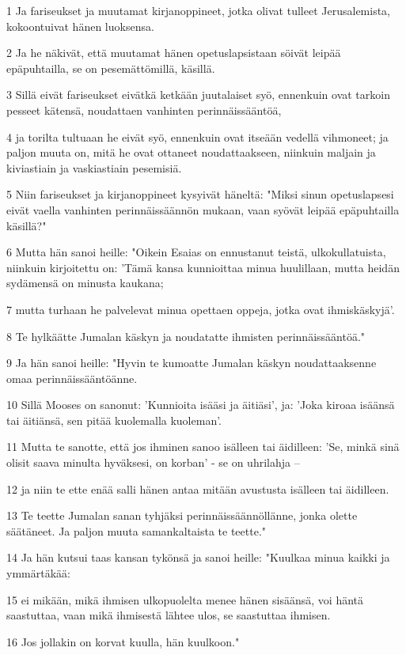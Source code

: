 \par 1 Ja fariseukset ja muutamat kirjanoppineet, jotka olivat tulleet Jerusalemista, kokoontuivat hänen luoksensa.
\par 2 Ja he näkivät, että muutamat hänen opetuslapsistaan söivät leipää epäpuhtailla, se on pesemättömillä, käsillä.
\par 3 Sillä eivät fariseukset eivätkä ketkään juutalaiset syö, ennenkuin ovat tarkoin pesseet kätensä, noudattaen vanhinten perinnäissääntöä,
\par 4 ja torilta tultuaan he eivät syö, ennenkuin ovat itseään vedellä vihmoneet; ja paljon muuta on, mitä he ovat ottaneet noudattaakseen, niinkuin maljain ja kiviastiain ja vaskiastiain pesemisiä.
\par 5 Niin fariseukset ja kirjanoppineet kysyivät häneltä: "Miksi sinun opetuslapsesi eivät vaella vanhinten perinnäissäännön mukaan, vaan syövät leipää epäpuhtailla käsillä?"
\par 6 Mutta hän sanoi heille: "Oikein Esaias on ennustanut teistä, ulkokullatuista, niinkuin kirjoitettu on: 'Tämä kansa kunnioittaa minua huulillaan, mutta heidän sydämensä on minusta kaukana;
\par 7 mutta turhaan he palvelevat minua opettaen oppeja, jotka ovat ihmiskäskyjä'.
\par 8 Te hylkäätte Jumalan käskyn ja noudatatte ihmisten perinnäissääntöä."
\par 9 Ja hän sanoi heille: "Hyvin te kumoatte Jumalan käskyn noudattaaksenne omaa perinnäissääntöänne.
\par 10 Sillä Mooses on sanonut: 'Kunnioita isääsi ja äitiäsi', ja: 'Joka kiroaa isäänsä tai äitiänsä, sen pitää kuolemalla kuoleman'.
\par 11 Mutta te sanotte, että jos ihminen sanoo isälleen tai äidilleen: 'Se, minkä sinä olisit saava minulta hyväksesi, on korban' - se on uhrilahja --
\par 12 ja niin te ette enää salli hänen antaa mitään avustusta isälleen tai äidilleen.
\par 13 Te teette Jumalan sanan tyhjäksi perinnäissäännöllänne, jonka olette säätäneet. Ja paljon muuta samankaltaista te teette."
\par 14 Ja hän kutsui taas kansan tykönsä ja sanoi heille: "Kuulkaa minua kaikki ja ymmärtäkää:
\par 15 ei mikään, mikä ihmisen ulkopuolelta menee hänen sisäänsä, voi häntä saastuttaa, vaan mikä ihmisestä lähtee ulos, se saastuttaa ihmisen.
\par 16 Jos jollakin on korvat kuulla, hän kuulkoon."
